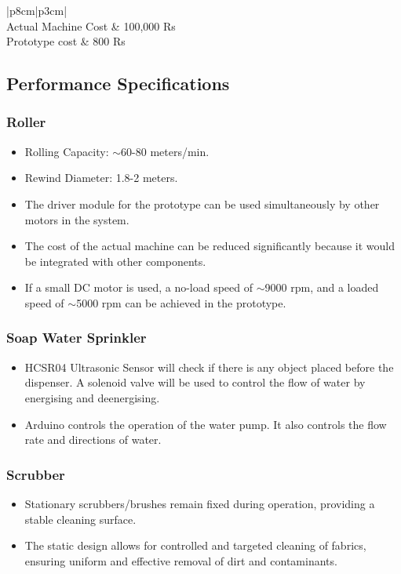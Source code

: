\documentclass[table]{rapportCS}
\begin{document}
\begin{center}
\begin{tabular}{|p{8cm}|p{3cm}|}
     \\
    \hline
    Actual Machine Cost & 100,000 Rs \\
    \hline
    Prototype cost & 800 Rs \\
    \hline
\end{tabular}
\end{center}
\subsection{Performance Specifications}\label{sec:perfspecs}
\subsubsection*{Roller}
        \begin{itemize}[label=$\bullet$]
        \item Rolling Capacity: $\sim$60-80 meters/min.
    \item Rewind Diameter: 1.8-2 meters.
    \item The driver module for the prototype can be used simultaneously by other motors in the system.
    \item The cost of the actual machine can be reduced significantly because it would be integrated with other components.
    \item If a small DC motor is used, a no-load speed of $\sim$9000 rpm, and a loaded speed of $\sim$5000 rpm can be achieved in the prototype. 
        \end{itemize}
    \subsubsection*{Soap Water Sprinkler}
        \begin{itemize}[label=$\bullet$]
        \item HCSR04 Ultrasonic Sensor will check if there is any object placed before the dispenser. A solenoid valve will be used to control the flow of water by energising and deenergising. 
        \item Arduino controls the operation of the water pump. It also controls the flow rate and directions of water.
        \end{itemize}
    \subsubsection*{Scrubber}
        \begin{itemize}[label=$\bullet$]
        \item Stationary scrubbers/brushes remain fixed during operation, providing a stable cleaning surface. 
        \item The static design allows for controlled and targeted cleaning of fabrics, ensuring uniform and effective removal of dirt and contaminants. 
        \end{itemize}
\end{document}

